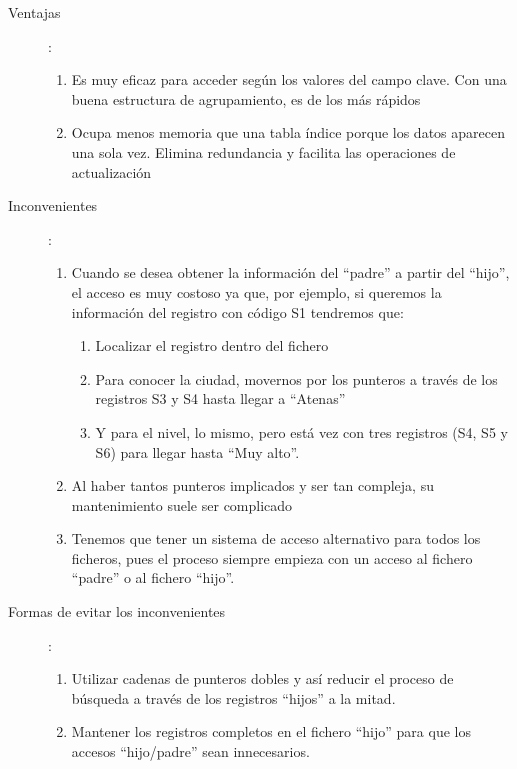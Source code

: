 \documentclass[10pt,a4paper,spanish]{report}
\begin{document}
\begin{description}
    \item[Ventajas]:

    \begin{enumerate}[$\heartsuit$]
        \item Es muy eficaz para acceder según los valores del campo clave. Con una buena estructura de agrupamiento, es de los más rápidos
        \item Ocupa menos memoria que una tabla índice porque los datos aparecen una sola vez. Elimina redundancia y facilita las operaciones de actualización
    \end{enumerate}

    \item[Inconvenientes]:

    \begin{enumerate}[$\heartsuit$]
        \item Cuando se desea obtener la información del ``padre'' a partir del ``hijo'', el acceso es muy costoso ya que, por ejemplo, si queremos la información del registro con código S1 tendremos que:
        \begin{enumerate}[1.]
            \item Localizar el registro dentro del fichero
            \item Para conocer la ciudad, movernos por los punteros a través de los registros S3 y S4 hasta llegar a ``Atenas''
            \item Y para el nivel, lo mismo, pero está vez con tres registros (S4, S5 y S6) para llegar hasta ``Muy alto''.
        \end{enumerate}
        \item Al haber tantos punteros implicados y ser tan compleja, su mantenimiento suele ser complicado
        \item Tenemos que tener un sistema de acceso alternativo para todos los ficheros, pues el proceso siempre empieza con un acceso al fichero ``padre'' o al fichero ``hijo''.
    \end{enumerate}

    \item[Formas de evitar los inconvenientes]:

    \begin{enumerate}[$\heartsuit$]
        \item Utilizar cadenas de punteros dobles y así reducir el proceso de búsqueda a través de los registros ``hijos'' a la mitad.
        \item Mantener los registros completos en el fichero ``hijo'' para que los accesos ``hijo/padre'' sean innecesarios.
    \end{enumerate}
\end{description}
\end{document}
